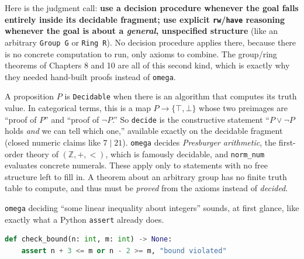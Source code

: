 Here is the judgment call: \textbf{use a decision procedure whenever the goal falls entirely inside its decidable fragment; use explicit \texttt{rw}/\texttt{have} reasoning whenever the goal is about a \emph{general}, unspecified structure} (like an arbitrary \texttt{Group G} or \texttt{Ring R}). No decision procedure applies there, because there is no concrete computation to run, only axioms to combine. The group/ring theorems of Chapters 8 and 10 are all of this second kind, which is exactly why they needed hand-built proofs instead of \texttt{omega}.

\begin{mathreading}

A proposition \(P\) is \texttt{Decidable} when there is an algorithm that computes its truth value. In categorical terms, this is a map \(P \to \{\top, \bot\}\) whose two preimages are ``proof of \(P\)'' and ``proof of \(\neg P\).'' So \texttt{decide} is the constructive statement ``\(P \vee
\neg P\) holds \emph{and} we can tell which one,'' available exactly on the decidable fragment (closed numeric claims like \(7 \mid 21\)). \texttt{omega} decides \emph{Presburger arithmetic}, the first-order theory of \((\mathbb{Z},
+, <)\), which is famously decidable, and \texttt{norm\_\allowbreak{}num} evaluates concrete numerals. These apply only to statements with no free structure left to fill in. A theorem about an arbitrary group has no finite truth table to compute, and thus must be \emph{proved} from the axioms instead of \emph{decided}.

\end{mathreading}

\begin{progcorner}

\texttt{omega} deciding ``some linear inequality about integers'' sounds, at first glance, like exactly what a Python \texttt{assert} already does.

\end{progcorner}

\begin{lstlisting}[language=Python,style=python]
def check_bound(n: int, m: int) -> None:
    assert n + 3 <= m or n - 2 >= m, "bound violated"
\end{lstlisting}


